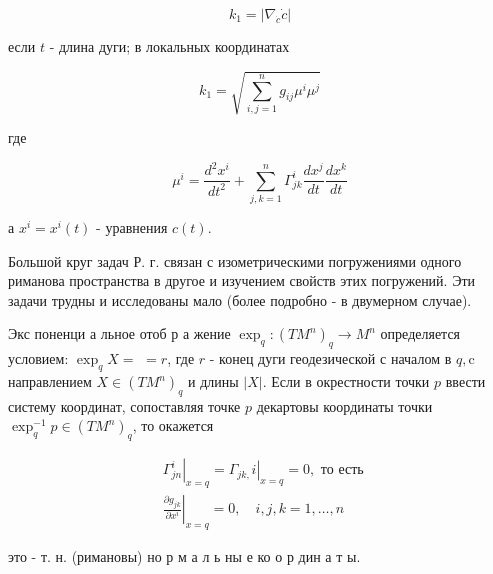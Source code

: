 \documentclass[10pt]{article}
\begin{document}
\[

k_{1}=\left|\nabla_{\dot{c}} \dot{c}\right|

\]



если $t$ - длина дуги; в локальных координатах



\[

k_{1}=\sqrt{\sum_{i, j=1}^{n} g_{i j} \mu^{i} \mu^{j}}

\]



где



\[

\mu^{i}=\frac{d^{2} x^{i}}{d t^{2}}+\sum_{j, k=1}^{n} \Gamma_{j k}^{i} \frac{d x^{j}}{d t} \frac{d x^{k}}{d t}

\]



а $x^{i}=x^{i}(t)$ - уравнения $c(t)$.



Большой круг задач Р. г. связан с изометрическими погружениями одного риманова пространства в другое и изучением свойств этих погружений. Эти задачи трудны и исследованы мало (более подробно - в двумерном случае).



Экс поненци а льное отоб р а жение $\exp _{q}:\left(T M^{n}\right)_{q} \rightarrow M^{n}$ определяется условием: $\exp _{q} X=$ $=r$, где $r$ - конец дуги геодезической с началом в $q, \mathrm{c}$ направлением $X \in\left(T M^{n}\right)_{q}$ и длины $|X|$. Если в окрестности точки $p$ ввести систему координат, сопоставляя точке $p$ декартовы координаты точки $\exp _{q}^{-1} p \in\left(T M^{n}\right)_{q}$, то окажется



\[

\begin{aligned}

& \left.\Gamma_{j n}^{i}\right|_{x=q}=\left.\Gamma_{j k,} i\right|_{x=q}=0, \text { то есть } \\

& \left.\frac{\partial g_{j k}}{\partial x^{i}}\right|_{x=q}=0, \quad i, j, k=1, \ldots, n

\end{aligned}

\]



это - т. н. (римановы) но р м а л ь ны е ко о р дин а т ы.
\end{document}
